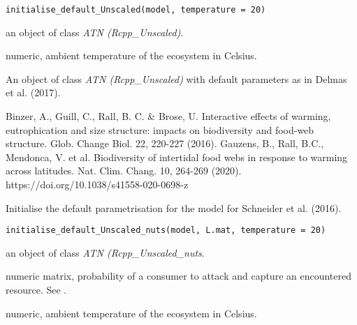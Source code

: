 \documentclass[letterpaper]{book}
\begin{document}
%
\begin{Usage}
\begin{verbatim}
initialise_default_Unscaled(model, temperature = 20)
\end{verbatim}
\end{Usage}
%
\begin{Arguments}
\begin{ldescription}
\item[\code{model}] an object of class \emph{ATN (Rcpp\_Unscaled)}.

\item[\code{temperature}] numeric, ambient temperature of the ecosystem in Celsius.
\end{ldescription}
\end{Arguments}
%
\begin{Value}
An object of class \emph{ATN (Rcpp\_Unscaled)} with default
parameters as in Delmas et al. (2017).
\end{Value}
%
\begin{References}\relax
Binzer, A., Guill, C., Rall, B. C. \& Brose, U.
Interactive effects of warming, eutrophication and size structure: impacts on biodiversity and food-web structure.
Glob. Change Biol. 22, 220-227 (2016).
Gauzens, B., Rall, B.C., Mendonca, V. et al.
Biodiversity of intertidal food webs in response to warming across latitudes.
Nat. Clim. Chang. 10, 264-269 (2020). https://doi.org/10.1038/s41558-020-0698-z
\end{References}
%
\begin{Description}\relax
Initialise the default parametrisation for the model for
Schneider et al. (2016).
\end{Description}
%
\begin{Usage}
\begin{verbatim}
initialise_default_Unscaled_nuts(model, L.mat, temperature = 20)
\end{verbatim}
\end{Usage}
%
\begin{Arguments}
\begin{ldescription}
\item[\code{model}] an object of class \emph{ATN (Rcpp\_Unscaled\_nuts}.

\item[\code{L.mat}] numeric matrix, probability of a consumer to attack and capture an encountered resource. See .

\item[\code{temperature}] numeric, ambient temperature of the ecosystem in Celsius.
\end{ldescription}
\end{Arguments}
\end{document}
